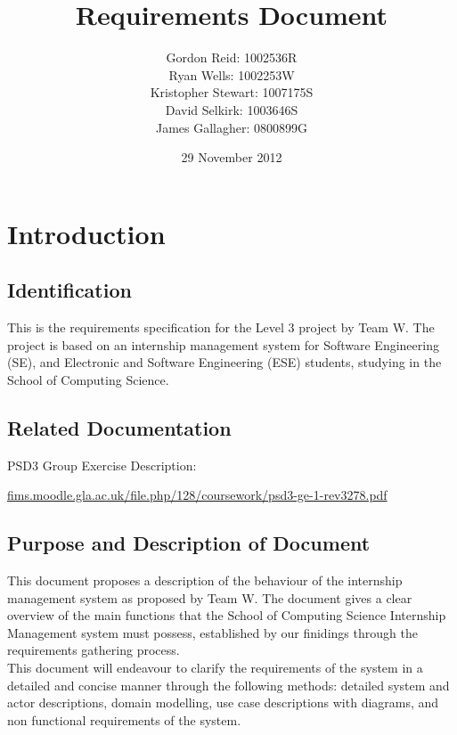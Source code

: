 \documentclass{l3deliverable}
\title{Requirements Document}
\author{
    Gordon Reid: 1002536R\\
    Ryan Wells: 1002253W\\
    Kristopher Stewart: 1007175S\\
    David Selkirk: 1003646S\\
    James Gallagher: 0800899G\\
}
\date{29 November 2012}
\begin{document}

\maketitle

\tableofcontents

\newpage


\section{Introduction}

\subsection{Identification}

This is the requirements specification for the Level 3 project by Team W. The
project is based on an internship management system for Software Engineering
(SE), and Electronic and Software Engineering (ESE) students, studying in the
School of Computing Science.

\subsection{Related Documentation}

PSD3 Group Exercise Description:

\url{fims.moodle.gla.ac.uk/file.php/128/coursework/psd3-ge-1-rev3278.pdf}

\subsection{Purpose and Description of Document}

This document proposes a description of the behaviour of the
internship management system as proposed by Team W. The document gives a
clear overview of the main functions that the School of Computing
Science Internship Management system must possess, established by our finidings through the requirements gathering process. \\

This document will endeavour to clarify the requirements of the system in a detailed and concise manner through the following methods: detailed system and actor descriptions, domain modelling, use case descriptions with diagrams, and non functional requirements of the system.
\end{document}
